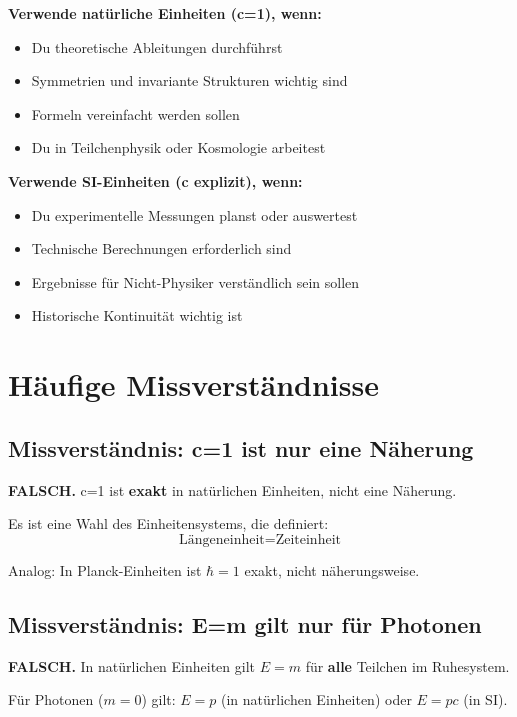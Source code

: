 	\textbf{Verwende natürliche Einheiten (c=1), wenn:}
	\begin{itemize}
		\item Du theoretische Ableitungen durchführst
		\item Symmetrien und invariante Strukturen wichtig sind
		\item Formeln vereinfacht werden sollen
		\item Du in Teilchenphysik oder Kosmologie arbeitest
	\end{itemize}
	
	\textbf{Verwende SI-Einheiten (c explizit), wenn:}
	\begin{itemize}
		\item Du experimentelle Messungen planst oder auswertest
		\item Technische Berechnungen erforderlich sind
		\item Ergebnisse für Nicht-Physiker verständlich sein sollen
		\item Historische Kontinuität wichtig ist
	\end{itemize}
	
	\section{Häufige Missverständnisse}
	
	\subsection{Missverständnis: c=1 ist nur eine Näherung}
	
	\textbf{FALSCH.} c=1 ist \textbf{exakt} in natürlichen Einheiten, nicht eine Näherung.
	
	Es ist eine Wahl des Einheitensystems, die definiert:
	\begin{equation}
		\text{Längeneinheit} = \text{Zeiteinheit}
	\end{equation}
	
	Analog: In Planck-Einheiten ist $\hbar=1$ exakt, nicht näherungsweise.
	
	\subsection{Missverständnis: E=m gilt nur für Photonen}
	
	\textbf{FALSCH.} In natürlichen Einheiten gilt $E=m$ für \textbf{alle} Teilchen im Ruhesystem.
	
	Für Photonen ($m=0$) gilt: $E = p$ (in natürlichen Einheiten) oder $E = pc$ (in SI).
	

